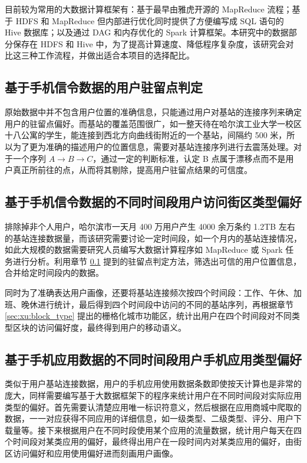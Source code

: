 目前较为常用的大数据计算框架有：基于最早由雅虎开源的 MapReduce 流程；基于 HDFS 和 MapReduce 但内部进行优化同时提供了方便编写成 SQL 语句的 Hive 数据库；以及通过 DAG 和内存优化的 Spark 计算框架。本研究中的数据部分保存在 HDFS 和 Hive 中，为了提高计算速度、降低程序复杂度，该研究会对比这三种工作流程，并做出适合本项目的选择配比。

\subsection{基于手机信令数据的用户驻留点判定}
\label{sec:stop_point}

原始数据中并不包含用户位置的准确信息，只能通过用户对基站的连接序列来确定用户的驻留点偏好。而基站的覆盖范围很广，如一整天待在哈尔滨工业大学一校区十八公寓的学生，能连接到西北方向曲线街附近的一个基站，间隔约 500 米，所以为了更为准确的描述用户的位置信息，需要对基站连接序列进行去震荡处理。对于一个序列 $A \to B \to C$，通过一定的判断标准，认定 B 点属于漂移点而不是用户真正所前往的点，从而将其剔除，提高用户驻留点结果的可信度。

\subsection{基于手机信令数据的不同时间段用户访问街区类型偏好}

排除掉非个人用户，哈尔滨市一天月 400 万用户产生 4000 余万条约 1.2TB 左右的基站连接数据量，而该研究需要讨论一定时间段，如一个月内的基站连接情况，如此大规模的数据需要研究人员编写大数据计算程序如 MapReduce 或 Spark 任务进行分析。利用章节 \ref{sec:stop_point} 提到的驻留点判定方法，筛选出可信的用户位置信息，合并给定时间段内的数据。

同时为了准确表达用户画像，还要将基站连接频次按四个时间段：工作、午休、加班、晚休进行统计，最后得到四个时间段中访问的不同的基站序列，再根据章节 \ref{sec:xu:block_type} 提出的栅格化城市功能区，统计出用户在四个时间段对不同类型区块的访问偏好度，最终得到用户的移动语义。

\subsection{基于手机应用数据的不同时间段用户手机应用类型偏好}

类似于用户基站连接数据，用户的手机应用使用数据条数即使按天计算也是非常的庞大，同样需要编写基于大数据框架下的程序来统计用户在不同时间段对实际应用类型的偏好。首先需要认清楚应用唯一标识符意义，然后根据在应用商城中爬取的数据，一一对应获得不同应用的详细信息，如一级类型、二级类型、评分、用户下载量等。接下来根据用户在不同时段使用某个应用的流量数据，统计用户每天在四个时间段对某类应用的偏好，最终得出用户在一段时间内对某类应用的偏好，由街区访问偏好和应用使用偏好进而刻画用户画像。

